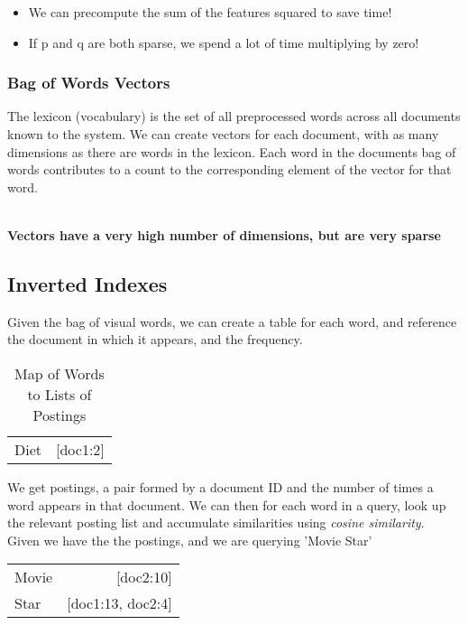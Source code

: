 \begin{itemize}
    \itemsep0em
    \item We can precompute the sum of the features squared to save time!
    \item If p and q are both sparse, we spend a lot of time multiplying by zero!
\end{itemize}


\subsubsection{Bag of Words Vectors}

The lexicon (vocabulary) is the set of all preprocessed words across all documents known to the system. We can create vectors for each document, with as many dimensions as there are words in the lexicon. Each word in the documents bag of words contributes to a count to the corresponding element of the vector for that word.

\\

\noindent \textbf{Vectors have a very high number of dimensions, but are very sparse}

\subsection{Inverted Indexes}

Given the bag of visual words, we can create a table for each word, and reference the document in which it appears, and the frequency.

\begin{table}[!h]
\centering
\begin{tabular}{lr}
Diet & {[}doc1:2{]} 
\end{tabular}
\caption{Map of Words to Lists of Postings}
\end{table}

\noindent We get postings, a pair formed by a document ID and the number of times a word appears in that document. We can then for each word in a query,  look up the relevant posting list and accumulate similarities using \textit{cosine similarity}.
\\

\noindent Given we have the the postings, and we are querying 'Movie Star'

\begin{table}[!h]
\centering
\begin{tabular}{lr}
Movie & {[}doc2:10{]} \\
Star & {[}doc1:13, doc2:4{]}
\end{tabular}
\end{table}

